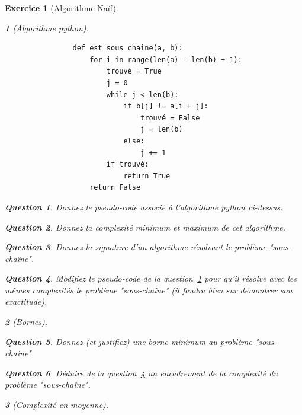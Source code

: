 \documentclass{article}
\theoremstyle{exostyle}
\newtheorem{exo}{Exercice}
\theoremstyle{partiestyle}
\newtheorem{partie}{}[exo]
\theoremstyle{questionstyle}
\newtheorem{questionpartie}{Question}[partie]
\begin{document}
\clearpage

\begin{exo}[Algorithme Naïf]
    \begin{partie}[Algorithme python]
        \label{algo-python-1}
        \begin{lstlisting}
                def est_sous_chaîne(a, b):
                    for i in range(len(a) - len(b) + 1):
                        trouvé = True
                        j = 0
                        while j < len(b):
                            if b[j] != a[i + j]:
                                trouvé = False
                                j = len(b)
                            else:
                                j += 1
                        if trouvé:
                            return True
                    return False
        \end{lstlisting}
        \begin{questionpartie}
            \label{algo-pseudo-1}
            Donnez le pseudo-code associé à l'algorithme python ci-dessus.
        \end{questionpartie}
        \begin{questionpartie}
            Donnez la complexité minimum et maximum de cet algorithme.
        \end{questionpartie}
        \begin{questionpartie}
            Donnez la signature d'un algorithme résolvant le problème "sous-chaîne".
        \end{questionpartie}
        \begin{questionpartie}
            \label{complexite-naif}
            Modifiez le pseudo-code de la question~\ref{algo-pseudo-1} pour qu'il résolve avec les mêmes complexités le problème "sous-chaîne" (il faudra bien sur démontrer son exactitude).
        \end{questionpartie}
    \end{partie}
    \begin{partie}[Bornes]
        \begin{questionpartie}
            Donnez (et justifiez) une borne minimum au problème "sous-chaîne".
        \end{questionpartie}
        \begin{questionpartie}
            Déduire de la question~\ref{complexite-naif} un encadrement de la complexité du problème "sous-chaîne".
        \end{questionpartie}
    \end{partie}
    \begin{partie}[Complexité en moyenne]

\end{partie}
\end{exo}
\end{document}
